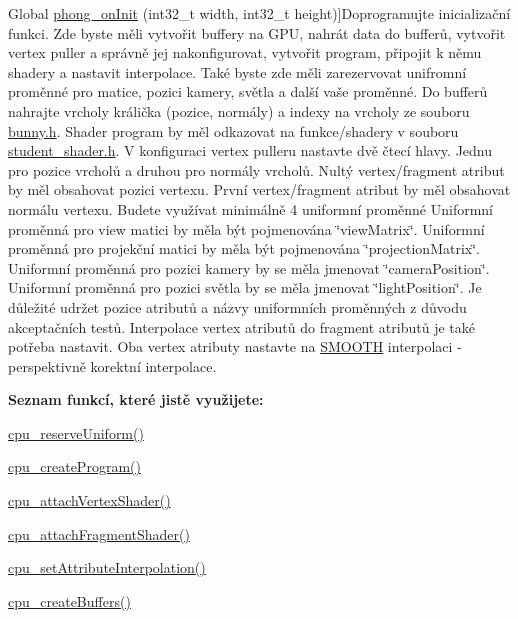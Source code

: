 \begin{DoxyRefList}
Global \hyperlink{group__cpu__side_gac2adb2ba4e748239b9db4d037584d3cc}{phong\-\_\-on\-Init} (int32\-\_\-t width, int32\-\_\-t height)]Doprogramujte inicializační funkci. Zde byste měli vytvořit buffery na G\-P\-U, nahrát data do bufferů, vytvořit vertex puller a správně jej nakonfigurovat, vytvořit program, připojit k němu shadery a nastavit interpolace. Také byste zde měli zarezervovat unifromní proměnné pro matice, pozici kamery, světla a další vaše proměnné. Do bufferů nahrajte vrcholy králička (pozice, normály) a indexy na vrcholy ze souboru \hyperlink{bunny_8h}{bunny.\-h}. Shader program by měl odkazovat na funkce/shadery v souboru \hyperlink{student__shader_8h}{student\-\_\-shader.\-h}. V konfiguraci vertex pulleru nastavte dvě čtecí hlavy. Jednu pro pozice vrcholů a druhou pro normály vrcholů. Nultý vertex/fragment atribut by měl obsahovat pozici vertexu. První vertex/fragment atribut by měl obsahovat normálu vertexu. Budete využívat minimálně 4 uniformní proměnné Uniformní proměnná pro view matici by měla být pojmenována \char`\"{}view\-Matrix\char`\"{}. Uniformní proměnná pro projekční matici by měla být pojmenována \char`\"{}projection\-Matrix\char`\"{}. Uniformní proměnná pro pozici kamery by se měla jmenovat \char`\"{}camera\-Position\char`\"{}. Uniformní proměnná pro pozici světla by se měla jmenovat \char`\"{}light\-Position\char`\"{}. Je důležité udržet pozice atributů a názvy uniformních proměnných z důvodu akceptačních testů. Interpolace vertex atributů do fragment atributů je také potřeba nastavit. Oba vertex atributy nastavte na \hyperlink{program_8h_a8472f01c511d77bbfb981a46618ea1eaa33c7ccbb848d8fd75455dd9786a1153a}{S\-M\-O\-O\-T\-H} interpolaci -\/ perspektivně korektní interpolace.\par
 {\bfseries Seznam funkcí, které jistě využijete\-:}
\begin{DoxyItemize}
\item \hyperlink{uniforms_8h_acd308bcb7720918cb48f75292a247dfb}{cpu\-\_\-reserve\-Uniform()}
\item \hyperlink{program_8h_a4fca7a0e3dac7f93620a1bde6efcde16}{cpu\-\_\-create\-Program()}
\item \hyperlink{program_8h_aaefc7833a6deea461cc06d00318f7975}{cpu\-\_\-attach\-Vertex\-Shader()}
\item \hyperlink{program_8h_a402ad69a9f1b80b8de408b991e190ed6}{cpu\-\_\-attach\-Fragment\-Shader()}
\item \hyperlink{program_8h_aca1c5019ec58c919160c4c12a5e5fa06}{cpu\-\_\-set\-Attribute\-Interpolation()}
\item \hyperlink{buffer_8h_a6ba9c58dc4b7bc81e83d3dae3c6b292f}{cpu\-\_\-create\-Buffers()}

\end{DoxyItemize}
\end{DoxyRefList}
